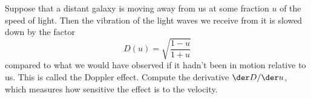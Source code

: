 Suppose that a distant galaxy is moving away from us at some fraction
$u$ of the speed of light. Then the vibration of the light waves we
receive from it is slowed down by the factor
\begin{equation*}
  D(u) = \sqrt{\frac{1-u}{1+u}}
\end{equation*}
compared to what we would have observed if it hadn't been in motion
relative to us. This is called the Doppler effect. Compute the derivative
$\der D/\der u$, which measures how sensitive the effect is to the velocity.
